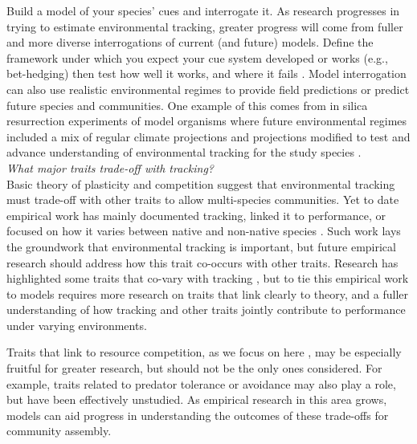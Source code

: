 \documentclass[11pt,letterpaper]{article}
\begin{document}
Build a model of your species' cues and interrogate it. As research progresses in trying to estimate environmental tracking, greater progress will come from fuller and more diverse interrogations of current (and future) models. Define the framework under which you expect your cue system developed or works (e.g., bet-hedging) then test how well it works, and where it fails \citep[see][for an example]{johanOCR}. Model interrogation can also use realistic environmental regimes to provide field predictions \citep{Wilczek:2010ad,Wilczek:2009oa} or predict future species and communities. One example of this comes from in silica resurrection experiments of model organisms where future environmental regimes included a mix of regular climate projections and projections modified to test and advance understanding of environmental tracking for the study species \citep[e.g., warmer winter and altered photoperiod scenarios in][]{fournier2016}.\\

\emph{What major traits trade-off with tracking?} \\ 
Basic theory of plasticity and competition suggest that environmental tracking must trade-off with other traits to allow multi-species communities. Yet to date empirical work has mainly documented tracking, linked it to performance, or focused on how it varies between native and non-native species \citep{Willis:2010al,wolkovichAmBot2013,Zettlemoyer2019}. Such work lays the groundwork that environmental tracking is important, but future empirical research should address how this trait co-occurs with other traits. Research has highlighted some traits that co-vary with tracking \citep[e.g.,][]{kharouba2014,lasky2016,Zhu2016BioLetters}, but to tie this empirical work to models requires more research on traits that link clearly to theory, and a fuller understanding of how tracking and other traits jointly contribute to performance under varying environments. 

Traits that link to resource competition, as we focus on here \citep[as others have as well, see][]{volkerass}, may be especially fruitful for greater research, but should not be the only ones considered. For example, traits related to predator tolerance or avoidance may also play a role, but have been effectively unstudied.  As empirical research in this area grows, models can aid progress in understanding the outcomes of these trade-offs for community assembly.\\ 
\end{document}
